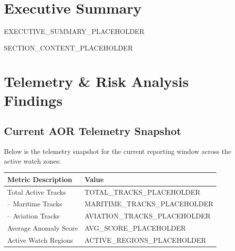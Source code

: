 \documentclass[11pt,a4paper]{article}
\begin{document}
\tableofcontents
\newpage

\section{Executive Summary}
EXECUTIVE_SUMMARY_PLACEHOLDER

\newpage


SECTION_CONTENT_PLACEHOLDER

\newpage

\section{Telemetry \& Risk Analysis Findings}

\subsection{Current AOR Telemetry Snapshot}
Below is the telemetry snapshot for the current reporting window across the active watch zones:

\vspace{0.3cm}
\begin{center}
\begin{tabular}{ll}
\toprule
\textbf{Metric Description} & \textbf{Value} \\
\midrule
Total Active Tracks & TOTAL_TRACKS_PLACEHOLDER \\
-- Maritime Tracks & MARITIME_TRACKS_PLACEHOLDER \\
-- Aviation Tracks & AVIATION_TRACKS_PLACEHOLDER \\
Average Anomaly Score & AVG_SCORE_PLACEHOLDER \\
Active Watch Regions & ACTIVE_REGIONS_PLACEHOLDER \\
\bottomrule
\end{tabular}
\end{center}
\vspace{0.3cm}
\end{document}
